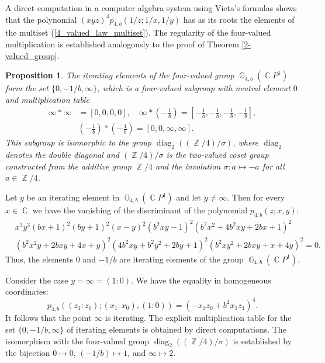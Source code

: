 \documentclass[14pt, dvipsnames]{extarticle}
\makeatletter
\theoremstyle{plain}
\newtheorem{prop}{Proposition}
\theoremstyle{definition}
\theoremstyle{remark}
\renewenvironment{proof}[1][\proofname]{
  \par\pushQED{\qed}\normalfont
  \topsep6\p@\@plus6\p@\relax
  \trivlist\item[\hskip\labelsep\bfseries\itshape #1\@addpunct{.}]
}{\popQED\endtrivlist\@endpefalse}
\DeclareMathOperator{\G}{\mathbb{G}}
\DeclareMathOperator{\Z}{\mathbb{Z}}
\DeclareMathOperator{\Cc}{\mathbb{C}}
\DeclareMathOperator{\diag}{\mathrm{diag}}
\makeatother
\begin{document}
\begin{proof}
{A direct computation in a computer algebra system using Vieta's formulas shows that the polynomial $(xyz)^4p_{4, b}(1/z; 1/x, 1/y)$ has as its roots the elements of the multiset (\ref{4_valued_law_multiset}). The regularity of the four-valued multiplication is established analogously to the proof of Theorem \ref{2-valued_group}.}  
\end{proof}

\begin{prop}\label{iterating_4-val}
{The iterating elements of the four-valued group $\G_{4, b}(\Cc\!P^1)$ form the set $\{0, -1/b, \infty\}$, which is a four-valued subgroup with neutral element $0$ and multiplication table
$$\begin{aligned}
\infty\ast\infty &= [0,0,0,0],\quad \infty\ast\left(-\frac{1}{b}\right) = \left [ -\frac{1}{b}, -\frac{1}{b}, -\frac{1}{b}, -\frac{1}{b} \right],\\
&\left(-\frac{1}{b}\right)\ast\left(-\frac{1}{b}\right) = [0,0,\infty,\infty].
\end{aligned}$$
This subgroup is isomorphic to the group $\diag_2((\Z/4)/{\sigma})$, where $\diag_2$ denotes the double diagonal and $(\Z/4)/{\sigma}$ is the two-valued coset group constructed from the additive group $\Z/4$ and the involution $\sigma:a\mapsto -a$ for all $a\in\Z/4$.} 
\end{prop}

\begin{proof}
Let $y$ be an iterating element in $\G_{4, b}(\Cc\!P^1)$ and let $y\neq\infty$. Then for every $x\in\Cc$ we have the vanishing of the discriminant of the polynomial $p_{4,b}(z; x, y)$:
$$\begin{aligned}
&x^3 y^3 (b x+1)^2 (b y+1)^2 (x-y)^2 \left(b^2 x y-1\right)^2 \left(b^2 x^2+4 b^2 x y+2 b x+1\right)^2\\
&\left(b^2 x^2 y+2 b x y+4 x+y\right)^2 \left(4 b^2 x y+b^2 y^2+2 b y+1\right)^2 \left(b^2 x y^2+2 b x y+x+4 y\right)^2 = 0.
\end{aligned}$$
Thus, the elements $0$ and $-1/b$ are iterating elements of the group $\G_{4, b}(\Cc\!P^1)$. 

{Consider the case $y = \infty = (1:0)$. We have the equality in homogeneous coordinates:
$$p_{4,b}((z_1:z_0); (x_1:x_0), (1:0)) = (-x_0z_0 + b^2x_1z_1)^4.$$
It follows that the point $\infty$ is iterating. The explicit multiplication table for the set $\{0, -1/b, \infty\}$ of iterating elements is obtained by direct computations. The isomorphism with the four-valued group $\diag_2((\Z/4)/{\sigma})$ is established by the bijection $0\mapsto 0$, $(-1/b)\mapsto 1$, and $\infty\mapsto 2$.} 
\end{proof}
\end{document}
